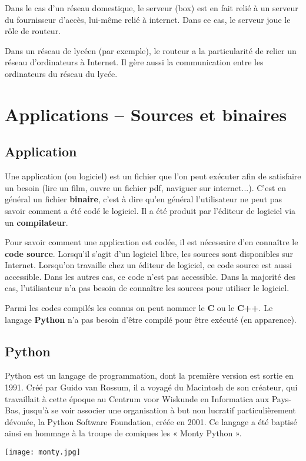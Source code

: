 Dans le cas d’un réseau domestique, le serveur (box) est en fait relié à un serveur du fournisseur d’accès, lui-même relié à internet. Dans ce cas, le serveur joue le rôle de routeur. 

Dans un réseau de lycéen (par exemple), le routeur a la particularité de relier un réseau d’ordinateurs à Internet. Il gère aussi la communication entre les ordinateurs du réseau du lycée.

\section{Applications -- Sources et binaires}
\subsection{Application}
Une application (ou logiciel) est un fichier que l'on peut exécuter afin de satisfaire un besoin (lire un film, ouvre un fichier pdf, naviguer sur internet...). C'est en général un fichier \textbf{binaire}, c'est à dire qu'en général l'utilisateur ne peut pas savoir comment a été codé le logiciel. Il a été produit par l'éditeur de logiciel via un \textbf{compilateur}.

Pour savoir comment une application est codée, il est nécessaire d'en connaître le \textbf{code source}.  Lorsqu'il s'agit d'un logiciel libre, les sources sont disponibles sur Internet. Lorsqu'on travaille chez un éditeur de logiciel, ce code source est aussi accessible. Dans les autres cas, ce code n'est pas accessible. Dans la majorité des cas, l'utilisateur n'a pas besoin de connaître les sources pour utiliser le logiciel. 

Parmi les codes compilés les connus on peut nommer le \textbf{C} ou le \textbf{C++}. Le langage \textbf{Python} n'a pas besoin d'être compilé pour être exécuté (en apparence). 




\subsection{Python}
\begin{minipage}[c]{.79\linewidth}

Python est un langage de programmation, dont la première version est sortie en 1991. Créé par Guido van Rossum, il a voyagé du Macintosh de son créateur, qui travaillait à cette époque au Centrum voor Wiskunde en Informatica aux Pays-Bas, jusqu'à se voir associer une organisation à but non lucratif particulièrement dévouée, la Python Software Foundation, créée en 2001. Ce langage a été baptisé ainsi en hommage à la troupe de comiques les « Monty Python ».
\end{minipage} \hfill
\begin{minipage}[c]{.2\linewidth}
\begin{center}
\texttt{[image: monty.jpg]}
\end{center}
\end{minipage}

